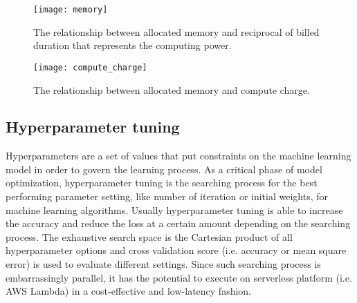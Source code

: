 \begin{figure}[t] \centering 
\texttt{[image: memory]}
\caption{The relationship between allocated memory and reciprocal of billed duration that represents the computing power.
\label{fig:memory}}
\end{figure}

\begin{figure}[t] \centering 
\texttt{[image: compute\_charge]}
\caption{The relationship between allocated memory and compute charge.
\label{fig:compute_charge}}
\end{figure}


\subsection{Hyperparameter tuning}

Hyperparameters are a set of values that put constraints on the machine learning model in order to govern the learning process. As a critical phase of model optimization, hyperparameter tuning is the searching process for the best performing parameter setting, like number of iteration or initial weights, for machine learning algorithms. Usually hyperparameter tuning is able to increase the accuracy and reduce the loss at a certain amount depending on the searching process. The exhaustive search space is the Cartesian product of all hyperparameter options and cross validation score (i.e. accuracy or mean square error) is used to evaluate different settings. Since such searching process is embarrassingly parallel, it has the potential to execute on serverless platform (i.e. AWS Lambda) in a cost-effective and low-latency fashion.
